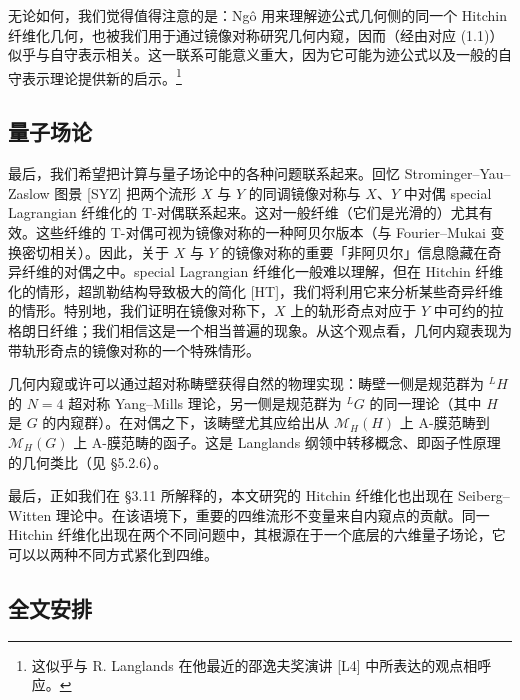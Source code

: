 无论如何，我们觉得值得注意的是：Ngô 用来理解迹公式几何侧的同一个 Hitchin 纤维化几何，也被我们用于通过镜像对称研究几何内窥，因而（经由对应 (1.1)）似乎与自守表示相关。这一联系可能意义重大，因为它可能为迹公式以及一般的自守表示理论提供新的启示。\footnote{这似乎与 R. Langlands 在他最近的邵逸夫奖演讲 [L4] 中所表达的观点相呼应。}

\subsection{量子场论}

最后，我们希望把计算与量子场论中的各种问题联系起来。回忆 Strominger--Yau--Zaslow 图景 [SYZ] 把两个流形 $X$ 与 $Y$ 的同调镜像对称与 $X$、$Y$ 中对偶 special Lagrangian 纤维化的 T-对偶联系起来。这对一般纤维（它们是光滑的）尤其有效。这些纤维的 T-对偶可视为镜像对称的一种阿贝尔版本（与 Fourier--Mukai 变换密切相关）。因此，关于 $X$ 与 $Y$ 的镜像对称的重要「非阿贝尔」信息隐藏在奇异纤维的对偶之中。special Lagrangian 纤维化一般难以理解，但在 Hitchin 纤维化的情形，超凯勒结构导致极大的简化 [HT]，我们将利用它来分析某些奇异纤维的情形。特别地，我们证明在镜像对称下，$X$ 上的轨形奇点对应于 $Y$ 中可约的拉格朗日纤维；我们相信这是一个相当普遍的现象。从这个观点看，几何内窥表现为带轨形奇点的镜像对称的一个特殊情形。


几何内窥或许可以通过超对称畴壁获得自然的物理实现：畴壁一侧是规范群为 ${}^{L}H$ 的 $N=4$ 超对称 Yang--Mills 理论，另一侧是规范群为 ${}^{L}G$ 的同一理论（其中 $H$ 是 $G$ 的内窥群）。在对偶之下，该畴壁尤其应给出从 $\mathcal{M}_H(H)$ 上 A-膜范畴到 $\mathcal{M}_H(G)$ 上 A-膜范畴的函子。这是 Langlands 纲领中转移概念、即函子性原理的几何类比（见 §5.2.6）。

最后，正如我们在 §3.11 所解释的，本文研究的 Hitchin 纤维化也出现在 Seiberg--Witten 理论中。在该语境下，重要的四维流形不变量来自内窥点的贡献。同一 Hitchin 纤维化出现在两个不同问题中，其根源在于一个底层的六维量子场论，它可以以两种不同方式紧化到四维。

\subsection{全文安排}

